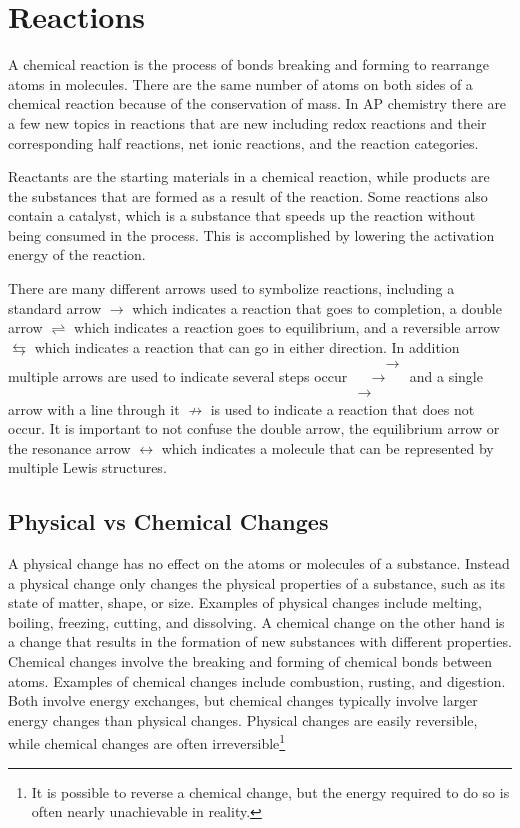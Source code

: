 \section{Reactions}
A chemical reaction is the process of bonds breaking and forming to rearrange atoms in molecules. There are the same number of atoms on both sides of a chemical reaction because of the conservation of mass. In AP chemistry there are a few new topics in reactions that are new including redox reactions and their corresponding half reactions, net ionic reactions, and the reaction categories. 

Reactants are the starting materials in a chemical reaction, while products are the substances that are formed as a result of the reaction. Some reactions also contain a catalyst, which is a substance that speeds up the reaction without being consumed in the process. This is accomplished by lowering the activation energy of the reaction.

There are many different arrows used to symbolize reactions, including a standard arrow $\rightarrow$ which indicates a reaction that goes to completion, a double arrow $\rightleftharpoons$ which indicates a reaction goes to equilibrium, and a reversible arrow $\leftrightarrows$ which indicates a reaction that can go in either direction. In addition multiple arrows are used to indicate several steps occur $\substack{\quad\quad\rightarrow\\[-1em]\quad \rightarrow \\[-1em] \rightarrow}$ and a single arrow with a line through it $\nrightarrow$ is used to indicate a reaction that does not occur. It is important to not confuse the double arrow, the equilibrium arrow or the resonance arrow $\leftrightarrow$ which indicates a molecule that can be represented by multiple Lewis structures.

\subsection{Physical vs Chemical Changes}
A physical change has no effect on the atoms or molecules of a substance. Instead a physical change only changes the physical properties of a substance, such as its state of matter, shape, or size. Examples of physical changes include melting, boiling, freezing, cutting, and dissolving. A chemical change on the other hand is a change that results in the formation of new substances with different properties. Chemical changes involve the breaking and forming of chemical bonds between atoms. Examples of chemical changes include combustion, rusting, and digestion. Both involve energy exchanges, but chemical changes typically involve larger energy changes than physical changes. Physical changes are easily reversible, while chemical changes are often irreversible\footnote{It is possible to reverse a chemical change, but the energy required to do so is often nearly unachievable in reality.}
